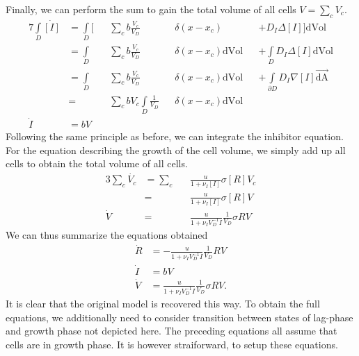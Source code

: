 \documentclass[10pt,A4paper]{article}
\numberwithin{equation}{section}
\begin{document}
Finally, we can perform the sum to gain the total volume of all cells $V=\sum\limits_c V_c$.
\begin{alignat}{7}
    \int\limits_D\dot{[I]} &= \int\limits_D \bigg[&&\sum\limits_c b\frac{V_c}{V_D}&&\delta(x-x_c) &&+ D_I\Delta [I]\bigg]\text{dVol}\\
    &= \int\limits_D&&\sum\limits_c b\frac{V_c}{V_D}&&\delta(x-x_c) \text{dVol} &&+ \int\limits_D D_I\Delta [I]\text{dVol}\\
    &= \int\limits_D&&\sum\limits_c b\frac{V_c}{V_D}&&\delta(x-x_c) \text{dVol} &&+ \int\limits_{\partial D} D_I\nabla [I]\vec{\text{dA}}\\
    &= &&\sum\limits_c b V_c\int\limits_D \frac{1}{V_D} &&\delta(x-x_c) \text{dVol}\\
    \dot{I} &= b V
\end{alignat}
Following the same principle as before, we can integrate the inhibitor equation.
For the equation describing the growth of the cell volume, we simply add up all cells to obtain the total volume of all cells.
\begin{alignat}{3}
    \sum\limits_c\dot{V_c}
    &= \sum\limits_c&&\frac{u}{1+\nu_I [I]} \sigma [R]V_c\\
    &= &&\frac{u}{1+\nu_I [I]} \sigma [R]V\\
    \dot{V} &= &&\frac{u}{1+\nu_I V_D^{-1} I} \frac{1}{V_D}\sigma R V
\end{alignat}
We can thus summarize the equations obtained
\begin{align}
    \dot{R} &= -\frac{u}{1+\nu_I V_D^{-1}I} \frac{1}{V_D} R V\\
    \dot{I} &= b V\\
    \dot{V} &= \frac{u}{1+\nu_I V_D^{-1} I} \frac{1}{V_D}\sigma R V.
\end{align}
It is clear that the original model is recovered this way.
To obtain the full equations, we additionally need to consider transition between states of lag-phase and growth phase not depicted here.
The preceding equations all assume that cells are in growth phase.
It is however straiforward, to setup these equations.
%
%
\end{document}
